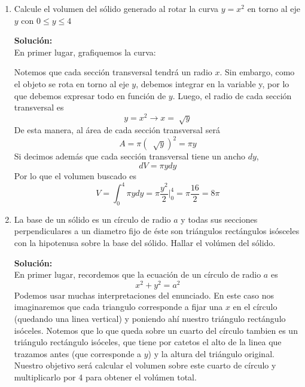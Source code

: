 \documentclass[12pt]{article}
\newenvironment{solucion}
{\begin{mdframed}[backgroundcolor=black!10]
		{\bf Solución:}\\
	}
	{
	\end{mdframed}
}
\newenvironment{preguntas}
{\begin{enumerate}\itemsep12pt
	}
	{
	\end{enumerate}
}
\newcommand{\ev}{\Big|}
\newcommand{\ra}{\rightarrow}
\begin{document}
\begin{preguntas}
\item Calcule el volumen del sólido generado al rotar la curva $y=x^2$ en torno al eje $y$ con $0 \leq y \leq 4$
\begin{solucion}
En primer lugar, grafiquemos la curva:
		\begin{center}
		\end{center}
	
		Notemos que cada sección transversal tendrá un radio $x$. Sin embargo, como el objeto se rota en torno al eje $y$, debemos integrar en la variable y, por lo que debemos expresar todo en función de $y$. Luego, el radio de cada sección transversal es 
		$$y = x^2 \ra x = \sqrt[]{y}$$
		De esta manera, al área de cada sección transversal será
		$$A = \pi (\ \sqrt[]{y})^2 = \pi y$$
		Si decimos además que cada sección transversal tiene un ancho $dy$,
		$$dV =  \pi y dy$$
	 	Por lo que el volumen buscado es
	 	$$V = \displaystyle \int_0^4 \pi y dy = \pi \dfrac{y^2}{2} \ev_0^4 = \pi \dfrac{16}{2} = 8 \pi$$
\end{solucion}
\item La base de un sólido es un círculo de radio $a$ y todas sus secciones perpendiculares a un diametro fijo de éste son triángulos rectángulos isósceles con la hipotenusa sobre la base del sólido. Hallar el volúmen del sólido.
\begin{solucion}
En primer lugar, recordemos que la ecuación de un círculo de radio $a$ es
		$$x^2 + y^2 = a^2$$
		Podemos usar muchas interpretaciones del enunciado. En este caso nos imaginaremos que cada triangulo corresponde a fijar una $x$ en el círculo (quedando una linea vertical) y poniendo ahí nuestro triángulo rectángulo isóceles. Notemos que lo que queda sobre un cuarto del círculo tambien es un triángulo rectángulo isóceles, que tiene por catetos el alto de la linea que trazamos antes (que corresponde a $y$) y la altura del triángulo original. Nuestro objetivo será calcular el volumen sobre este cuarto de círculo y multiplicarlo por 4 para obtener el volúmen total.
		

\end{solucion}
\end{preguntas}
\end{document}
